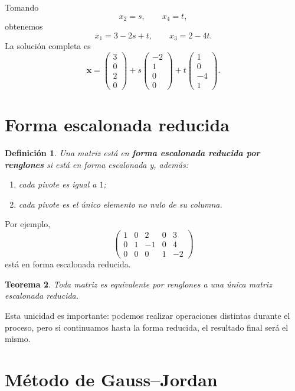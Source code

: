\documentclass[12pt]{article}
\newtheorem{definicion}{Definición}[section]
\newtheorem{teorema}[definicion]{Teorema}
\theoremstyle{remark}
\begin{document}
Tomando
\[
x_2=s,\qquad x_4=t,
\]
obtenemos
\[
x_1=3-2s+t,\qquad x_3=2-4t.
\]
La solución completa es
\[
\mathbf{x}=
\begin{pmatrix}3\\0\\2\\0\end{pmatrix}
+s\begin{pmatrix}-2\\1\\0\\0\end{pmatrix}
+t\begin{pmatrix}1\\0\\-4\\1\end{pmatrix}.
\]

\section{Forma escalonada reducida}

\begin{definicion}
Una matriz está en \textbf{forma escalonada reducida por renglones} si está en forma escalonada y,
además:
\begin{enumerate}
\item cada pivote es igual a $1$;
\item cada pivote es el único elemento no nulo de su columna.
\end{enumerate}
\end{definicion}

Por ejemplo,
\[
\begin{pmatrix}
1&0&2&0&3\\
0&1&-1&0&4\\
0&0&0&1&-2
\end{pmatrix}
\]
está en forma escalonada reducida.

\begin{teorema}
Toda matriz es equivalente por renglones a una única matriz escalonada reducida.
\end{teorema}

Esta unicidad es importante: podemos realizar operaciones distintas durante el proceso, pero si
continuamos hasta la forma reducida, el resultado final será el mismo.


\section{Método de Gauss--Jordan}
\end{document}
